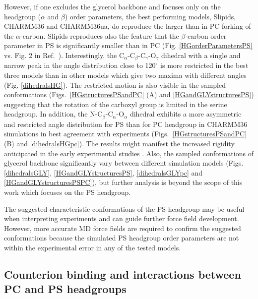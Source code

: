 \documentclass[aps,prl,superscriptaddress,twocolumn]{revtex4}
\begin{document}
However, if one excludes the glycerol backbone and focuses only on the headgroup ($\alpha$ and $\beta$) order parameters,
the best performing models,
Slipids, CHARMM36 and CHARMM36ua, do reproduce the larger-than-in-PC forking of the $\alpha$-carbon.
Slipids reproduces also the feature that the $\beta$-carbon order parameter
in PS is significantly smaller than in PC (Fig. \ref{HGorderParametersPS} vs. Fig. 2 in Ref.~).
Interestingly, the C$_\alpha$-C$_\beta$-C$_\gamma$-O$_\gamma$  dihedral with
a single and narrow peak in the angle distribution close to 120$^{\circ}$ is more restricted
in the best three models than in other models which give two maxima with different angles (Fig. \ref{dihedralsHG}).
The restricted motion is also
visible in the sampled conformations (Figs.~\ref{HGstructuresPSandPC} (A) and \ref{HGandGLYstructuresPS})
suggesting that the rotation of the carboxyl group is limited in the serine headgroup.
In addition, the N-C$_\beta$-C$_\alpha$-O$_\alpha$ dihedral exhibits a more asymmetric
and restricted angle distribution for PS than for PC headgroup in
CHARMM36 simulations in best agreement with experiments
(Figs.~\ref{HGstructuresPSandPC} (B) and \ref{dihedralsHGpc}).
The results might manifest the increased rigidity anticipated in the early experimental studies \cite{browning80,buldt81}.
Also, the sampled conformations of glycerol backbone
significantly vary between different simulation models 
(Figs. \ref{dihedralsGLY}, \ref{HGandGLYstructuresPS}, \ref{dihedralsGLYpc} and \ref{HGandGLYstructuresPSPC}),
but further analysis is beyond the scope of this work which focuses on the PS headgroup.

The suggested characteristic conformations of the PS headgroup may be useful when interpreting experiments and
can guide further force field development. However, more accurate MD force fields are
required to confirm the suggested conformations because the simulated PS headgroup order parameters
are not within the experimental error in any of the tested models.

%



\subsection{Counterion binding and interactions between PC and PS headgroups}\label{ciBINDINGsection}
\end{document}
